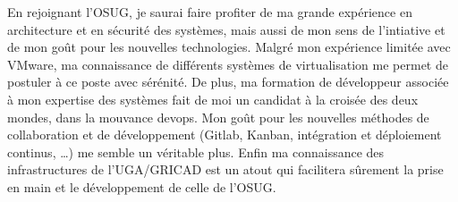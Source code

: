 \documentclass[11pt, a4paper]{awesome-cv}
\begin{document}
\begin{cvletter}
En rejoignant l'OSUG, je saurai faire profiter de ma grande expérience en architecture et en sécurité des systèmes, mais aussi de mon sens de l'intiative et de mon goût pour les nouvelles technologies. Malgré mon expérience limitée avec VMware, ma connaissance de différents systèmes de virtualisation me permet de postuler à ce poste avec sérénité. De plus, ma formation de développeur associée à mon expertise des systèmes fait de moi un candidat à la croisée des deux mondes, dans la mouvance devops. Mon goût pour les nouvelles méthodes de collaboration et de développement (Gitlab, Kanban, intégration et déploiement continus, …) me semble un véritable plus. Enfin ma connaissance des infrastructures de l'UGA/GRICAD est un atout qui facilitera sûrement la prise en main et le développement de celle de l'OSUG.
%
%
%
\end{cvletter}


\makeletterclosing
\end{document}
